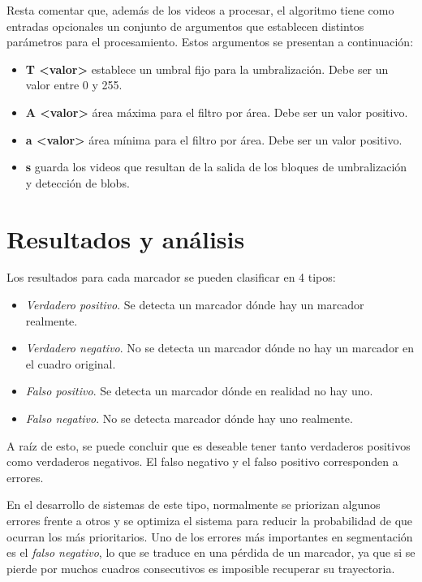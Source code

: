  Resta comentar que, además de los videos a procesar, el algoritmo tiene como entradas opcionales un conjunto de argumentos que establecen distintos parámetros para el procesamiento. Estos argumentos se presentan a continuación:

 \begin{itemize}
\item \textbf{T <valor>} establece un umbral fijo para la umbralización. Debe ser un valor entre 0 y 255.
\item \textbf{A <valor>} área máxima para el filtro por área. Debe ser un valor positivo.
\item \textbf{a <valor>} área mínima para el filtro por área. Debe ser un valor positivo.
\item \textbf{s} guarda los videos que resultan de la salida de los bloques de umbralización y detección de blobs.
 \end{itemize}

\section{Resultados y análisis}
\label{resultadosyanalisissegmentacion}
Los resultados para cada marcador se pueden clasificar en 4 tipos:
\begin{itemize}
\item \textit{Verdadero positivo}. Se detecta un marcador dónde hay un marcador realmente.
\item \textit{Verdadero negativo}. No se detecta un marcador dónde no hay un marcador en el cuadro original.
\item \textit{Falso positivo}. Se detecta un marcador dónde en realidad no hay uno.
\item \textit{Falso negativo}. No se detecta marcador dónde hay uno realmente.
\end{itemize}


A raíz de esto, se puede concluir que es deseable tener tanto verdaderos positivos como verdaderos negativos. El falso negativo y el falso positivo corresponden a errores. 

En el desarrollo de sistemas de este tipo, normalmente se priorizan algunos errores frente a otros y se optimiza el sistema para reducir la probabilidad de que ocurran los más prioritarios. Uno de los errores más importantes en segmentación es el \textit{falso negativo}, lo que se traduce en una pérdida de un marcador, ya que si se pierde por muchos cuadros consecutivos es imposible recuperar su trayectoria. 

